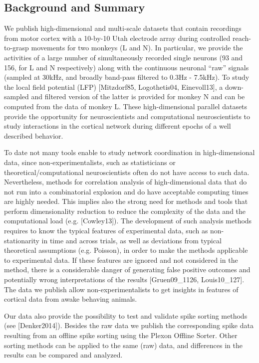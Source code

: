 \subsection{Background and Summary}

We publish high-dimensional and multi-scale datasets that contain recordings from motor cortex with a 10-by-10 Utah electrode array during controlled reach-to-grasp movements for two monkeys (L and N). In particular, we provide the activities of a large number of simultaneously recorded single neurons (93 and 156, for L and N respectively) along with the continuous neuronal “raw” signals (sampled at 30kHz, and broadly band-pass filtered to 0.3Hz - 7.5kHz). To study the local field potential (LFP) [Mitzdorf85, Logothetis04, Einevoll13], a down-sampled and filtered version of the latter is provided for monkey N and can be computed from the data of monkey L. These high-dimensional parallel datasets provide the opportunity for neuroscientists and computational neuroscientists to study interactions in the cortical network during different epochs of a well described behavior. 

To date not many tools enable to study network coordination in high-dimensional data, since non-experimentalists, such as statisticians or theoretical/computational neuroscientists often do not have access to such data. Nevertheless, methods for correlation analysis of high-dimensional data that do not run into a combinatorial explosion and do have acceptable computing times are highly needed. This implies also the strong need for methods and tools that perform dimensionality reduction to reduce the complexity of the data and the computational load (e.g. [Cowley13]). The development of such analysis methods requires to know the typical features of experimental data, such as non-stationarity in time and across trials, as well as deviations from typical theoretical assumptions (e.g. Poisson), in order to make the methods applicable to experimental data. If these features are ignored and not considered in the method, there is a considerable danger of generating false positive outcomes and potentially wrong interpretations of the results [Gruen09\_1126, Louis10\_127]. The data we publish allow non-experimentalists to get insights in features of cortical data from awake behaving animals.

Our data also provide the possibility to test and validate spike sorting methods (see [Denker2014]). Besides the raw data we publish the corresponding spike data resulting from an offline spike sorting using the Plexon Offline Sorter. Other sorting methods can be applied to the same (raw) data, and differences in the results can be compared and analyzed.

